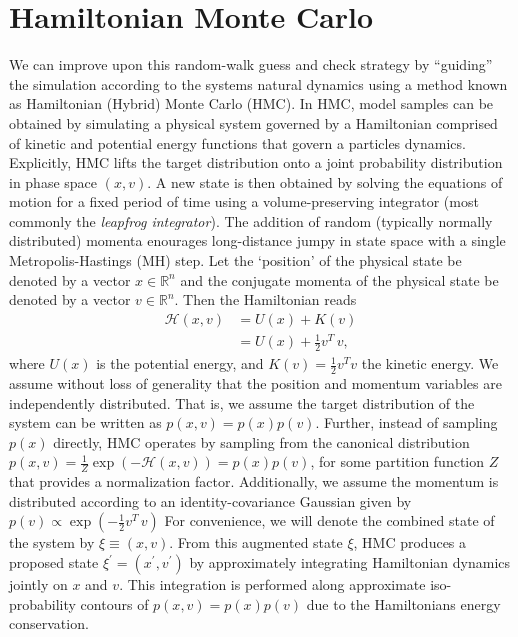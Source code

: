 \documentclass[../main.tex]{subfiles}
\begin{document}
\section{Hamiltonian Monte Carlo}%
\label{sec:l2hmc_hmc}
We can improve upon this random-walk guess and check strategy by ``guiding'' the simulation according to the systems
natural dynamics using a method known as Hamiltonian (Hybrid) Monte Carlo (HMC).
%
In HMC, model samples can be obtained by simulating a physical system governed by a Hamiltonian comprised of kinetic
and potential energy functions that govern a particles dynamics.
%
Explicitly, HMC lifts the target distribution onto a joint probability distribution in phase space $(x, v)$. 
%
A new state is then obtained by solving the equations of motion for a fixed period of time using a volume-preserving
integrator (most commonly the \emph{leapfrog integrator}).
%
The addition of random (typically normally distributed) momenta enourages long-distance jumpy in state space with a
single Metropolis-Hastings (MH) step.
%
Let the `position' of the physical state be denoted by a vector $x \in\mathbb{R}^{n}$ and the conjugate momenta of the
physical state be denoted by a vector $v \in\mathbb{R}^{n}$.  Then the Hamiltonian reads
%
\begin{align}
    \mathcal{H}(x, v) &= U(x) + K(v)\\
                      & = U(x) + \frac{1}{2} v^{T} \,v,
    \label{eq:hamiltonian}
\end{align}
%
where $U(x)$ is the potential energy, and $K(v)=\frac{1}{2}v^{T}v$ the kinetic energy.
%
We assume without loss of generality that the position and momentum variables are independently distributed.
%
That is, we assume the target distribution of the system can be written as $p(x, v) = p(x) p(v)$.
%
Further, instead of sampling $p(x)$ directly, HMC operates by sampling from the canonical distribution $p(x, v) =
\frac{1}{Z} \exp(-\mathcal{H}(x, v)) = p(x) p(v)$, for some partition function $Z$ that provides a normalization
factor.
%
Additionally, we assume the momentum is distributed according to an identity-covariance Gaussian given by $p(v) \propto
\exp{(-\frac{1}{2} v^{T} \, v)}$ For convenience, we will denote the combined state of the system by $\xi \equiv (x,
v)$.
%
From this augmented state $\xi$, HMC produces a proposed state $\xi^{\prime} = (x^{\prime}, v^{\prime})$ by
approximately integrating Hamiltonian dynamics jointly on $x$ and $v$.
%
This integration is performed along approximate iso-probability contours of $p(x, v) = p(x) p(v)$ due to the
Hamiltonians energy conservation.
%
\end{document}
